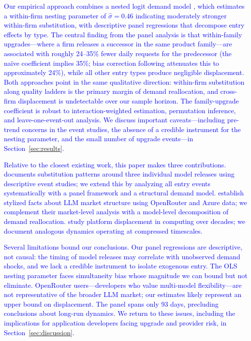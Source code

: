 \documentclass[11pt, a4paper]{article}
\begin{document}
\textcolor{blue}{Our empirical approach combines a nested logit demand model \citep{berry1994estimating, mcfadden1978modelling}, which estimates a within-firm nesting parameter of $\hat{\sigma} = 0.46$ indicating moderately stronger within-firm substitution, with descriptive panel regressions that decompose entry effects by type. The central finding from the panel analysis is that within-family upgrades---where a firm releases a successor in the same product family---are associated with roughly 24--35\% fewer daily requests for the predecessor (the na\"ive coefficient implies 35\%; bias correction following \citealt{roth2022pretest} attenuates this to approximately 24\%), while all other entry types produce negligible displacement. Both approaches point in the same qualitative direction: within-firm substitution along quality ladders is the primary margin of demand reallocation, and cross-firm displacement is undetectable over our sample horizon. The family-upgrade coefficient is robust to \citet{sunAbraham2021} interaction-weighted estimation, permutation inference, and leave-one-event-out analysis. We discuss important caveats---including pre-trend concerns in the event studies, the absence of a credible instrument for the nesting parameter, and the small number of upgrade events---in Section~\ref{sec:results}.}

\textcolor{blue}{Relative to the closest existing work, this paper makes three contributions. \citet{fradkin2025demand} documents substitution patterns around three individual model releases using descriptive event studies; we extend this by analyzing all entry events systematically with a panel framework and a structural demand model. \citet{demirer2025emerging} establish stylized facts about LLM market structure using OpenRouter and Azure data; we complement their market-level analysis with a model-level decomposition of demand reallocation. \citet{bresnahan1999technological} study platform displacement in computing over decades; we document analogous dynamics operating at compressed timescales.}

\textcolor{blue}{Several limitations bound our conclusions. Our panel regressions are descriptive, not causal: the timing of model releases may correlate with unobserved demand shocks, and we lack a credible instrument to isolate exogenous entry. The OLS nesting parameter faces simultaneity bias whose magnitude we can bound but not eliminate. OpenRouter users---developers who value multi-model flexibility---are not representative of the broader LLM market; our estimates likely represent an upper bound on displacement. The panel spans only 93 days, precluding conclusions about long-run dynamics. We return to these issues, including the implications for application developers facing upgrade and provider risk, in Section~\ref{sec:discussion}.}
\end{document}
